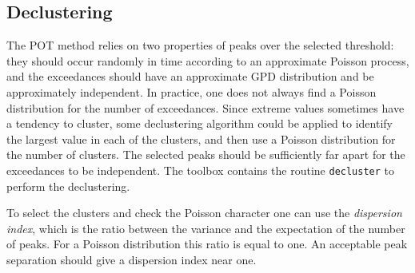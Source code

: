 \subsection{Declustering}
The POT method relies on two properties of peaks over the selected
threshold: they should occur randomly in time according to an approximate
Poisson process, and the exceedances should have an approximate
GPD distribution and be approximately independent.
In practice, one does not always find a Poisson distribution for the
number of exceedances. Since extreme values sometimes have a tendency
to cluster, some declustering algorithm could be applied to identify
the largest value in each of the clusters, and then use a Poisson
distribution for the number of clusters. The selected peaks should be
sufficiently far apart for the exceedances to be independent.
The \progname{} toolbox
contains the routine {\tt decluster} to perform the declustering.

To select the clusters and
check the Poisson character one can use the {\it dispersion index},
 which is the ratio between
the variance and the expectation of the number of peaks. For a Poisson
distribution this ratio is equal to one. An acceptable peak separation
should give a dispersion index near one.

